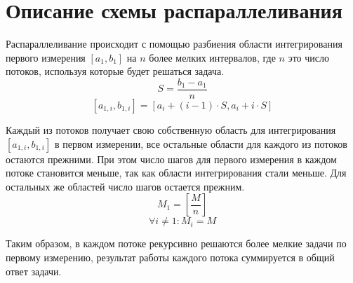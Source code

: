 \documentclass{report}
\begin{document}
\newpage

\section*{Описание схемы распараллеливания}
\par Распараллеливание происходит с помощью разбиения области интегрирования первого измерения $[a_{1}, b_{1}]$ на $n$ более мелких интервалов, где $n$ это число потоков, используя которые будет решаться задача.
$$ S = \frac{b_{1} - a_{1}}{n} $$
$$ [a_{1, i}, b_{1, i}] = [a_{i} + (i-1)\cdot S, a_{i} + i\cdot S]$$
\par Каждый из потоков получает свою собственную область для интегрирования $[a_{1, i}, b_{1, i}]$ в первом измерении, все остальные области для каждого из потоков остаются прежними. При этом число шагов для первого измерения в каждом потоке становится меньше, так как области интегрирования стали меньше. Для остальных же областей число шагов остается прежним.
$$ M_{1} = [\frac{M}{n}] $$
$$ \forall i \neq 1 :M_{i} = M $$
\par Таким образом, в каждом потоке рекурсивно решаются более мелкие задачи по первому измерению, результат работы каждого потока суммируется в общий ответ задачи.
\newpage

\end{document}
